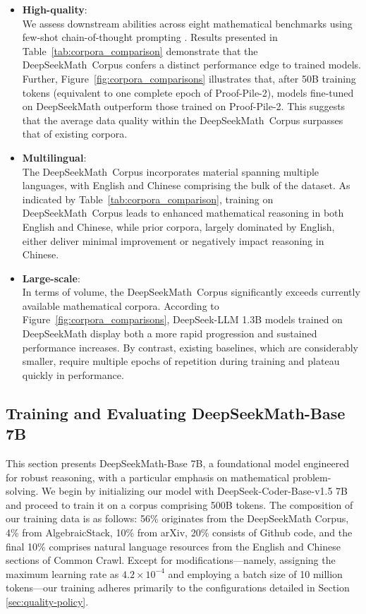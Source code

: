 \begin{itemize}[topsep=0pt]
    \item \textbf{High-quality}:\\
    We assess downstream abilities across eight mathematical benchmarks using few-shot chain-of-thought prompting \cite{cot}. Results presented in Table~\ref{tab:corpora_comparison} demonstrate that the DeepSeekMath~Corpus confers a distinct performance edge to trained models. Further, Figure~\ref{fig:corpora_comparisons} illustrates that, after 50B training tokens (equivalent to one complete epoch of Proof-Pile-2), models fine-tuned on DeepSeekMath outperform those trained on Proof-Pile-2. This suggests that the average data quality within the DeepSeekMath~Corpus surpasses that of existing corpora.
    \item \textbf{Multilingual}:\\
    The DeepSeekMath~Corpus incorporates material spanning multiple languages, with English and Chinese comprising the bulk of the dataset. As indicated by Table~\ref{tab:corpora_comparison}, training on DeepSeekMath~Corpus leads to enhanced mathematical reasoning in both English and Chinese, while prior corpora, largely dominated by English, either deliver minimal improvement or negatively impact reasoning in Chinese.
    \item \textbf{Large-scale}:\\
    In terms of volume, the DeepSeekMath~Corpus significantly exceeds currently available mathematical corpora. According to Figure~\ref{fig:corpora_comparisons}, DeepSeek-LLM 1.3B models trained on DeepSeekMath display both a more rapid progression and sustained performance increases. By contrast, existing baselines, which are considerably smaller, require multiple epochs of repetition during training and plateau quickly in performance.
\end{itemize}

\subsection{Training and Evaluating DeepSeekMath-Base 7B}

This section presents DeepSeekMath-Base 7B, a foundational model engineered for robust reasoning, with a particular emphasis on mathematical problem-solving. We begin by initializing our model with DeepSeek-Coder-Base-v1.5 7B \citep{deepseek-coder} and proceed to train it on a corpus comprising 500B tokens. The composition of our training data is as follows: 56\% originates from the DeepSeekMath Corpus, 4\% from AlgebraicStack, 10\% from arXiv, 20\% consists of Github code, and the final 10\% comprises natural language resources from the English and Chinese sections of Common Crawl. Except for modifications—namely, assigning the maximum learning rate as $4.2\times10^{-4}$ and employing a batch size of 10 million tokens—our training adheres primarily to the configurations detailed in Section \ref{sec:quality-policy}.

